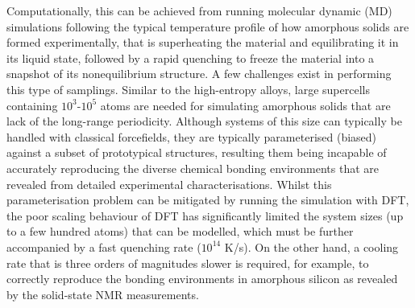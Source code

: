 Computationally, this can be achieved from running molecular dynamic (MD) simulations following the typical temperature profile of how amorphous solids are formed experimentally, that is superheating the material and equilibrating it in its liquid state, followed by a rapid quenching to freeze the material into a snapshot of its nonequilibrium structure. A few challenges exist in performing this type of samplings. Similar to the high-entropy alloys, large supercells containing $10^3$-$10^5$ atoms are needed for simulating amorphous solids that are lack of the long-range periodicity. Although systems of this size can typically be handled with classical forcefields, they are typically parameterised (biased) against a subset of prototypical structures, resulting them being incapable of accurately reproducing the diverse chemical bonding environments that are revealed from detailed experimental characterisations.\cite{de2019transferability} Whilst this parameterisation problem can be mitigated by running the simulation with DFT, the poor scaling behaviour of DFT has significantly limited the system sizes (up to a few hundred atoms) that can be modelled, which must be further accompanied by a fast quenching rate ($10^{14}$ K/s).\cite{cooper2000density} On the other hand, a cooling rate that is three orders of magnitudes slower is required, for example, to correctly reproduce the bonding environments in amorphous silicon\cite{deringer2018realistic} as revealed by the solid-state NMR measurements. 

